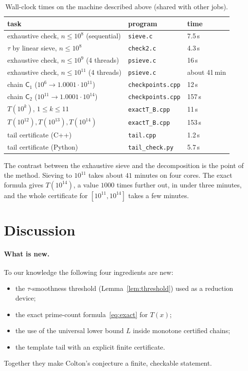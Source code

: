 \documentclass[11pt,a4paper]{article}
\theoremstyle{definition}
\begin{document}
\begin{table}[ht]
\centering
\caption{Wall-clock times on the machine described above (shared with other jobs).}\label{tab:timing}
\begin{tabular}{lll}
\toprule
task & program & time\\
\midrule
exhaustive check, $n\le10^{8}$ (sequential) & \texttt{sieve.c} & 7.5\,s\\
$\tau$ by linear sieve, $n\le10^{8}$ & \texttt{check2.c} & 4.3\,s\\
exhaustive check, $n\le10^{9}$ (4 threads) & \texttt{psieve.c} & 16\,s\\
exhaustive check, $n\le10^{11}$ (4 threads) & \texttt{psieve.c} & about 41\,min\\
chain $\mathsf C_1$ ($10^6\to1.0001\cdot10^{11}$) & \texttt{checkpoints.cpp} & 12\,s\\
chain $\mathsf C_2$ ($10^{11}\to1.0001\cdot10^{14}$) & \texttt{checkpoints.cpp} & 157\,s\\
$T(10^{k})$, $1\le k\le 11$ & \texttt{exactT\_B.cpp} & 11\,s\\
$T(10^{12}),T(10^{13}),T(10^{14})$ & \texttt{exactT\_B.cpp} & 153\,s\\
tail certificate (C++) & \texttt{tail.cpp} & 1.2\,s\\
tail certificate (Python) & \texttt{tail\_check.py} & 5.7\,s\\
\bottomrule
\end{tabular}
\end{table}

The contrast between the exhaustive sieve and the decomposition is the point of the method. Sieving to $10^{11}$ takes about $41$ minutes on four cores. The exact formula gives $T(10^{14})$, a value $1000$ times further out, in under three minutes, and the whole certificate for $[10^{11},10^{14}]$ takes a few minutes.

\section{Discussion}\label{sec:discussion}

\paragraph{What is new.}
To our knowledge the following four ingredients are new:
\begin{itemize}
\item the $\tau$-smoothness threshold (Lemma~\ref{lem:threshold}) used as a reduction device;
\item the exact prime-count formula~\eqref{eq:exact} for $T(x)$;
\item the use of the universal lower bound $L$ inside monotone certified chains;
\item the template tail with an explicit finite certificate.
\end{itemize}
Together they make Colton's conjecture a finite, checkable statement.
\end{document}

